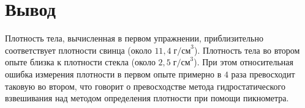 \section{Вывод}

Плотность тела, вычисленная в первом упражнении, приблизительно соответствует плотности свинца (около $11{,}4\;\text{г/см}^3$). Плотность тела во втором опыте близка к плотности стекла (около $2{,}5\;\text{г/см}^3$). При этом относительная ошибка измерения плотности в первом опыте примерно в $4$ раза превосходит таковую во втором, что говорит о превосходстве метода гидростатического взвешивания над методом определения плотности при помощи пикнометра.